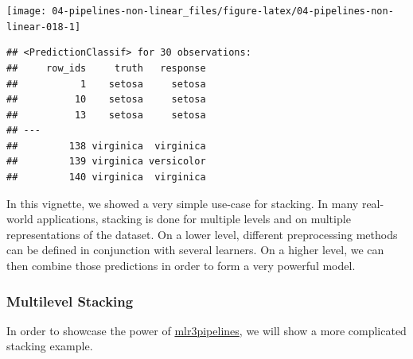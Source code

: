 \documentclass[
]{scrbook}
\newenvironment{Shaded}{\begin{snugshade}}{\end{snugshade}}
\newcommand{\AttributeTok}[1]{\textcolor[rgb]{0.77,0.63,0.00}{#1}}
\newcommand{\ConstantTok}[1]{\textcolor[rgb]{0.00,0.00,0.00}{#1}}
\newcommand{\FunctionTok}[1]{\textcolor[rgb]{0.00,0.00,0.00}{#1}}
\newcommand{\NormalTok}[1]{#1}
\newcommand{\OtherTok}[1]{\textcolor[rgb]{0.56,0.35,0.01}{#1}}
\newcommand{\SpecialCharTok}[1]{\textcolor[rgb]{0.00,0.00,0.00}{#1}}
\newcommand{\StringTok}[1]{\textcolor[rgb]{0.31,0.60,0.02}{#1}}
\renewenvironment{Shaded} {\begin{snugshade}\small} {\end{snugshade}}
\begin{document}
\begin{Shaded}
\end{Shaded}

\begin{center}\texttt{[image: 04-pipelines-non-linear\_files/figure-latex/04-pipelines-non-linear-018-1]} \end{center}

\begin{Shaded}
\end{Shaded}

\begin{verbatim}
## <PredictionClassif> for 30 observations:
##     row_ids     truth   response
##           1    setosa     setosa
##          10    setosa     setosa
##          13    setosa     setosa
## ---                             
##         138 virginica  virginica
##         139 virginica versicolor
##         140 virginica  virginica
\end{verbatim}

In this vignette, we showed a very simple use-case for stacking.
In many real-world applications, stacking is done for multiple levels and on multiple representations of the dataset.
On a lower level, different preprocessing methods can be defined in conjunction with several learners.
On a higher level, we can then combine those predictions in order to form a very powerful model.

\hypertarget{multilevel-stacking}{%
\subsubsection{Multilevel Stacking}\label{multilevel-stacking}}

In order to showcase the power of \href{https://mlr3pipelines.mlr-org.com}{mlr3pipelines}, we will show a more complicated stacking example.
\end{document}

